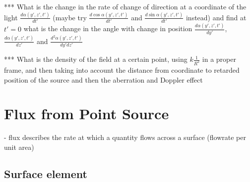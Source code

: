 *** What is the change in the rate of change of direction at a coordinate of the light $\frac{d\alpha(y{'},z{'},t{'})}{dt{'}}$ (maybe try $\frac{d\cos\alpha(y{'},z{'},t{'})}{dt{'}}$ and $\frac{d\sin\alpha(y{'},z{'},t{'})}{dt{'}}$ instead) and find at $t{'}=0$ what is the change in the angle with change in position $\frac{d\alpha(y{'},z{'},t{'})}{dy{'}}$, $\frac{d\alpha(y{'},z{'},t{'})}{dz{'}}$ and $\frac{d^2\alpha(y{'},z{'},t{'})}{dy{'}dz{'}}$

*** What is the density of the field at a certain point, using $k \frac{1}{R^2}$ in a proper frame, and then taking into account the distance from coordinate to retarded position of the source and then the aberration and Doppler effect

\section{Flux from Point Source}

- flux describes the rate at which a quantity flows across a surface (flowrate per unit area)

\subsection{Surface element}

